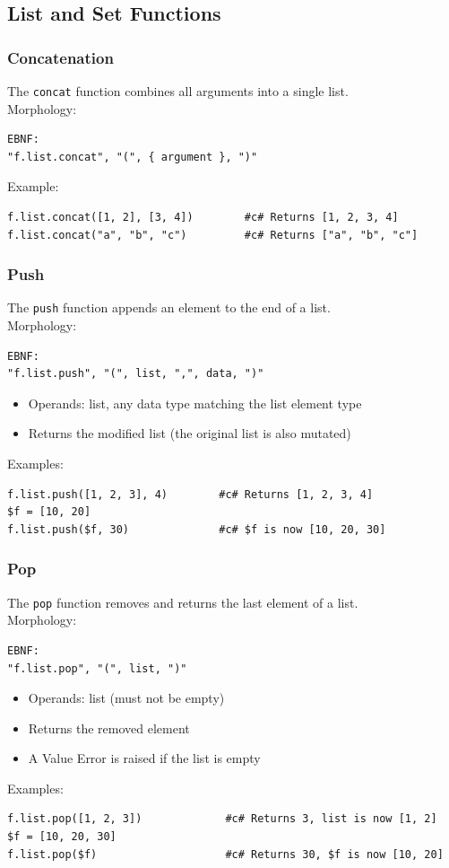 \subsection{List and Set Functions}

\subsubsection{Concatenation}
The \texttt{concat} function combines all arguments into a single list. \\
Morphology:
\begin{verbatim}
EBNF:
"f.list.concat", "(", { argument }, ")"
\end{verbatim}
Example:
\begin{verbatim}
f.list.concat([1, 2], [3, 4])        #c# Returns [1, 2, 3, 4]
f.list.concat("a", "b", "c")         #c# Returns ["a", "b", "c"]
\end{verbatim}

\subsubsection{Push}
The \texttt{push} function appends an element to the end of a list.\\
Morphology:
\begin{verbatim}
EBNF:
"f.list.push", "(", list, ",", data, ")"
\end{verbatim}
\begin{itemize}
\item Operands: list, any data type matching the list element type
\item Returns the modified list (the original list is also mutated)
\end{itemize}
Examples:
\begin{verbatim}
f.list.push([1, 2, 3], 4)        #c# Returns [1, 2, 3, 4]
$f = [10, 20]
f.list.push($f, 30)              #c# $f is now [10, 20, 30]
\end{verbatim}

\subsubsection{Pop}
The \texttt{pop} function removes and returns the last element of a list.\\
Morphology:
\begin{verbatim}
EBNF:
"f.list.pop", "(", list, ")"
\end{verbatim}
\begin{itemize}
\item Operands: list (must not be empty)
\item Returns the removed element
\item A Value Error is raised if the list is empty
\end{itemize}
Examples:
\begin{verbatim}
f.list.pop([1, 2, 3])             #c# Returns 3, list is now [1, 2]
$f = [10, 20, 30]
f.list.pop($f)                    #c# Returns 30, $f is now [10, 20]
\end{verbatim}

